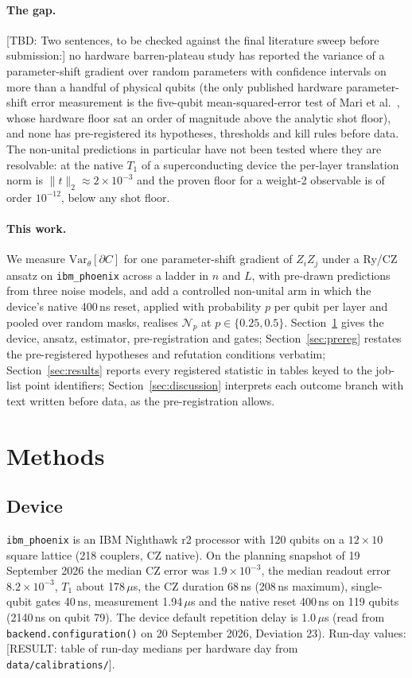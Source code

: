 \documentclass[aps,prxquantum,reprint,superscriptaddress,nofootinbib,longbibliography,amsmath,amssymb]{revtex4-2}
\newcommand{\placeholder}[1]{\textcolor{red!70!black}{[RESULT: #1]}}
\newcommand{\tbd}[1]{\textcolor{orange!80!black}{[TBD: #1]}}
\newcommand{\Var}{\mathrm{Var}}
\newcommand{\Np}{\mathcal{N}_p}
\begin{document}
\paragraph{The gap.} \tbd{Two sentences, to be checked against the final literature sweep before submission:} no hardware barren-plateau study has reported the variance of a parameter-shift gradient over random parameters with confidence intervals on more than a handful of physical qubits (the only published hardware parameter-shift error measurement is the five-qubit mean-squared-error test of Mari et al.~\cite{Mari2021}, whose hardware floor sat an order of magnitude above the analytic shot floor), and none has pre-registered its hypotheses, thresholds and kill rules before data. The non-unital predictions in particular have not been tested where they are resolvable: at the native $T_1$ of a superconducting device the per-layer translation norm is $\|t\|_2 \approx 2\times10^{-3}$ and the proven floor for a weight-2 observable is of order $10^{-12}$, below any shot floor.

\paragraph{This work.} We measure $\Var_\theta[\partial C]$ for one parameter-shift gradient of $Z_iZ_j$ under a Ry/CZ ansatz on \texttt{ibm\_phoenix} across a ladder in $n$ and $L$, with pre-drawn predictions from three noise models, and add a controlled non-unital arm in which the device's native 400\,ns reset, applied with probability $p$ per qubit per layer and pooled over random masks, realises $\Np$ at $p \in \{0.25, 0.5\}$. Section~\ref{sec:methods} gives the device, ansatz, estimator, pre-registration and gates; Section~\ref{sec:prereg} restates the pre-registered hypotheses and refutation conditions verbatim; Section~\ref{sec:results} reports every registered statistic in tables keyed to the job-list point identifiers; Section~\ref{sec:discussion} interprets each outcome branch with text written before data, as the pre-registration allows.

\section{Methods}\label{sec:methods}

\subsection{Device}\label{sec:device}
\texttt{ibm\_phoenix} is an IBM Nighthawk r2 processor with 120 qubits on a $12\times10$ square lattice (218 couplers, CZ native). On the planning snapshot of 19 September 2026 the median CZ error was $1.9\times10^{-3}$, the median readout error $8.2\times10^{-3}$, $T_1$ about 178\,$\mu$s, the CZ duration 68\,ns (208\,ns maximum), single-qubit gates 40\,ns, measurement 1.94\,$\mu$s and the native reset 400\,ns on 119 qubits (2140\,ns on qubit 79). The device default repetition delay is 1.0\,$\mu$s (read from \texttt{backend.configuration()} on 20 September 2026, Deviation 23). Run-day values: \placeholder{table of run-day medians per hardware day from \texttt{data/calibrations/}}.
\end{document}
